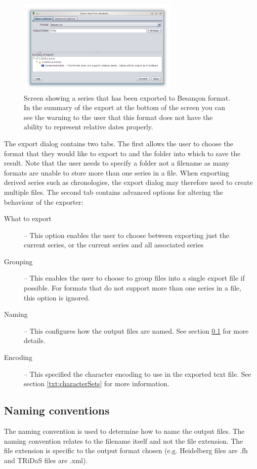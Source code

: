 \begin{figure}
  \centering
    \includegraphics[width=0.7\textwidth]{Images/exportdata1.png}
    \caption{Screen showing a series that has been exported to Besan\c{c}on format.  In the summary of the export at the bottom of the screen you can see the warning to the user that this format does not have the ability to represent relative dates properly.}
    \label{fig:exportdata}
\end{figure}

The export dialog contains two tabs.  The first allows the user to choose the format that they would like to export to and the folder into which to save the result.  Note that the user needs to specify a folder not a filename as many formats are unable to store more than one series in a file.  When exporting derived series such as chronologies, the export dialog may therefore need to create multiple files.  The second tab contains advanced options for altering the behaviour of the exporter:

\begin{description}
 \item[What to export] -- This option enables the user to choose between exporting just the current series, or the current series and all associated series
 \item[Grouping]  -- This enables the user to choose to group files into a single export file if possible.  For formats that do not support more than one series in a file, this option is ignored.
 \item[Naming] -- This configures how the output files are named.  See section \ref{txt:namingConventions} for more details.
 \item[Encoding] -- This specified the character encoding to use in the exported text file. See section \ref{txt:characterSets} for more information. 
\end{description}

\subsection{Naming conventions}
\label{txt:namingConventions}
The naming convention is used to determine how to name the output files. The naming convention
relates to the filename itself and not the file extension. The file extension is specific to the output format
chosen (e.g. Heidelberg files are .fh and TRiDaS files are .xml).


